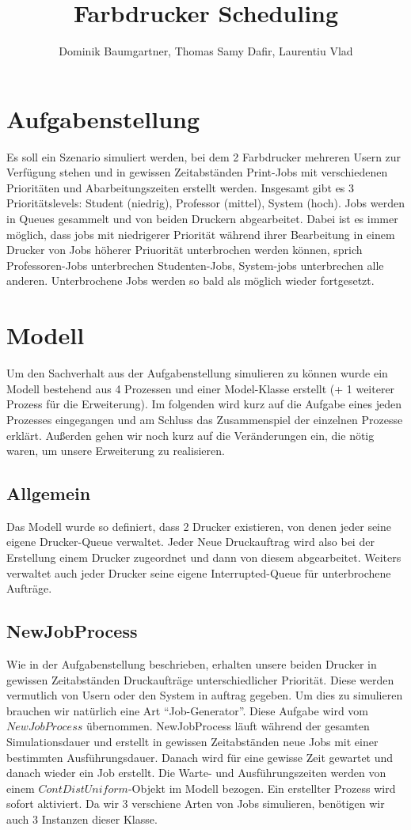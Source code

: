\documentclass[12pt,a4paper]{article}
\title{Farbdrucker Scheduling}
\author{Dominik Baumgartner, Thomas Samy Dafir, Laurentiu Vlad}
\date{}
\begin{document}
	\maketitle
	
	\section{Aufgabenstellung}
	Es soll ein Szenario simuliert werden, bei dem 2 Farbdrucker mehreren Usern zur Verfügung stehen und in gewissen Zeitabständen Print-Jobs mit
	verschiedenen Prioritäten und Abarbeitungszeiten erstellt werden. Insgesamt gibt es 3 Prioritätslevels: Student (niedrig), Professor (mittel), System (hoch). Jobs
	werden in Queues gesammelt und von beiden Druckern abgearbeitet. Dabei ist es immer möglich, dass jobs mit niedrigerer Priorität während ihrer Bearbeitung in 
	einem Drucker von Jobs höherer Priuorität unterbrochen werden können, sprich Professoren-Jobs unterbrechen Studenten-Jobs, System-jobs unterbrechen alle 
	anderen. Unterbrochene Jobs werden so bald als möglich wieder fortgesetzt.
	
	\section{Modell}
	Um den Sachverhalt aus der Aufgabenstellung simulieren zu können wurde ein Modell bestehend aus 4 Prozessen und einer Model-Klasse erstellt (+ 1 weiterer Prozess für die Erweiterung).
	Im folgenden wird kurz auf die Aufgabe eines jeden Prozesses eingegangen und am Schluss das Zusammenspiel der einzelnen Prozesse erklärt. Außerden gehen wir noch kurz auf die Veränderungen
	ein, die nötig waren, um unsere Erweiterung zu realisieren.
	
	\subsection{Allgemein}
	Das Modell wurde so definiert, dass 2 Drucker existieren, von denen jeder seine eigene Drucker-Queue verwaltet. Jeder Neue Druckauftrag wird also bei der Erstellung einem Drucker zugeordnet
	und dann von diesem abgearbeitet. Weiters verwaltet auch jeder Drucker seine eigene Interrupted-Queue für unterbrochene Aufträge.
	
	\subsection{NewJobProcess}
	Wie in der Aufgabenstellung beschrieben, erhalten unsere beiden Drucker in gewissen Zeitabständen Druckaufträge unterschiedlicher Priorität. Diese werden vermutlich von Usern oder den System
	in auftrag gegeben. Um dies zu simulieren brauchen wir natürlich eine Art ``Job-Generator''. Diese Aufgabe wird vom $NewJobProcess$ übernommen. NewJobProcess läuft während der gesamten 
	Simulationsdauer und erstellt in gewissen Zeitabständen neue Jobs mit einer bestimmten Ausführungsdauer. Danach wird für eine gewisse Zeit gewartet und danach wieder ein Job erstellt. Die Warte-
	und Ausführungszeiten werden von einem $ContDistUniform$-Objekt im Modell bezogen. Ein erstellter Prozess wird sofort aktiviert. Da wir 3 verschiene Arten von Jobs simulieren, benötigen wir auch
	3 Instanzen dieser Klasse.
	
\end{document}
